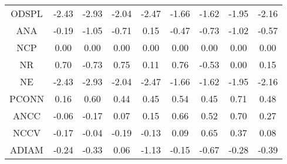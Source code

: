 \begin{longtable}{ | c || c | c | c | c | c | c | c || c |}
ODSPL &  \cellcolor[HTML]{FFBFBF} -2.43 &  \cellcolor[HTML]{FFB7B7} -2.93 &  \cellcolor[HTML]{FFCFCF} -2.04 &  \cellcolor[HTML]{FFBFBF} -2.47 &  \cellcolor[HTML]{FFD7D7} -1.66 &  \cellcolor[HTML]{FFD7D7} -1.62 &  \cellcolor[HTML]{FFCFCF} -1.95 &  \cellcolor[HTML]{FFC7C7} -2.16 \\
ANA &  \cellcolor[HTML]{FFF7F7} -0.19 &  \cellcolor[HTML]{FFE7E7} -1.05 &  \cellcolor[HTML]{FFEFEF} -0.71 &  \cellcolor[HTML]{FFFFFF} 0.15 &  \cellcolor[HTML]{FFF7F7} -0.47 &  \cellcolor[HTML]{FFEFEF} -0.73 &  \cellcolor[HTML]{FFE7E7} -1.02 &  \cellcolor[HTML]{FFEFEF} -0.57 \\
NCP &  \cellcolor[HTML]{FFFFFF} 0.00 &  \cellcolor[HTML]{FFFFFF} 0.00 &  \cellcolor[HTML]{FFFFFF} 0.00 &  \cellcolor[HTML]{FFFFFF} 0.00 &  \cellcolor[HTML]{FFFFFF} 0.00 &  \cellcolor[HTML]{FFFFFF} 0.00 &  \cellcolor[HTML]{FFFFFF} 0.00 &  \cellcolor[HTML]{FFFFFF} 0.00 \\
NR &  \cellcolor[HTML]{EFEFFF} 0.70 &  \cellcolor[HTML]{FFEFEF} -0.73 &  \cellcolor[HTML]{EFEFFF} 0.75 &  \cellcolor[HTML]{FFFFFF} 0.11 &  \cellcolor[HTML]{EFEFFF} 0.76 &  \cellcolor[HTML]{FFEFEF} -0.53 &  \cellcolor[HTML]{FFFFFF} 0.00 &  \cellcolor[HTML]{FFFFFF} 0.15 \\
NE &  \cellcolor[HTML]{FFBFBF} -2.43 &  \cellcolor[HTML]{FFB7B7} -2.93 &  \cellcolor[HTML]{FFCFCF} -2.04 &  \cellcolor[HTML]{FFBFBF} -2.47 &  \cellcolor[HTML]{FFD7D7} -1.66 &  \cellcolor[HTML]{FFD7D7} -1.62 &  \cellcolor[HTML]{FFCFCF} -1.95 &  \cellcolor[HTML]{FFC7C7} -2.16 \\
PCONN &  \cellcolor[HTML]{F7F7FF} 0.16 &  \cellcolor[HTML]{EFEFFF} 0.60 &  \cellcolor[HTML]{F7F7FF} 0.44 &  \cellcolor[HTML]{F7F7FF} 0.45 &  \cellcolor[HTML]{EFEFFF} 0.54 &  \cellcolor[HTML]{F7F7FF} 0.45 &  \cellcolor[HTML]{EFEFFF} 0.71 &  \cellcolor[HTML]{EFEFFF} 0.48 \\
ANCC &  \cellcolor[HTML]{FFFFFF} -0.06 &  \cellcolor[HTML]{FFF7F7} -0.17 &  \cellcolor[HTML]{FFFFFF} 0.07 &  \cellcolor[HTML]{FFFFFF} 0.15 &  \cellcolor[HTML]{EFEFFF} 0.66 &  \cellcolor[HTML]{EFEFFF} 0.52 &  \cellcolor[HTML]{EFEFFF} 0.70 &  \cellcolor[HTML]{F7F7FF} 0.27 \\
NCCV &  \cellcolor[HTML]{FFF7F7} -0.17 &  \cellcolor[HTML]{FFFFFF} -0.04 &  \cellcolor[HTML]{FFF7F7} -0.19 &  \cellcolor[HTML]{FFFFFF} -0.13 &  \cellcolor[HTML]{FFFFFF} 0.09 &  \cellcolor[HTML]{EFEFFF} 0.65 &  \cellcolor[HTML]{F7F7FF} 0.37 &  \cellcolor[HTML]{FFFFFF} 0.08 \\
ADIAM &  \cellcolor[HTML]{FFF7F7} -0.24 &  \cellcolor[HTML]{FFF7F7} -0.33 &  \cellcolor[HTML]{FFFFFF} 0.06 &  \cellcolor[HTML]{FFDFDF} -1.13 &  \cellcolor[HTML]{FFFFFF} -0.15 &  \cellcolor[HTML]{FFEFEF} -0.67 &  \cellcolor[HTML]{FFF7F7} -0.28 &  \cellcolor[HTML]{FFF7F7} -0.39 \\

\end{longtable}
